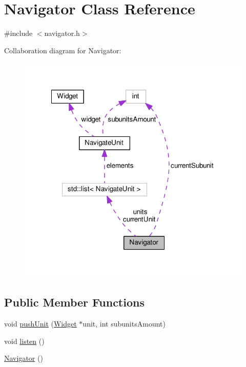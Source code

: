 \hypertarget{class_navigator}{\section{Navigator Class Reference}
\label{class_navigator}
}


{\ttfamily \#include $<$navigator.\-h$>$}



Collaboration diagram for Navigator\-:
\nopagebreak
\begin{figure}[H]
\begin{center}
\leavevmode
\includegraphics[width=318pt]{class_navigator__coll__graph}
\end{center}
\end{figure}
\subsection*{Public Member Functions}
\begin{DoxyCompactItemize}
\item 
void \hyperlink{class_navigator_a47967fc9bdfd276c98f8ed1c44d5dc46}{push\-Unit} (\hyperlink{class_widget}{Widget} $\ast$unit, int subunits\-Amount)
\item 
void \hyperlink{class_navigator_ab9b30029b9ef06cca27ebc5b2549121c}{listen} ()
\item 
\hyperlink{class_navigator_a59230ab4698882f754d5ce275a1a4030}{Navigator} ()
\end{DoxyCompactItemize}
